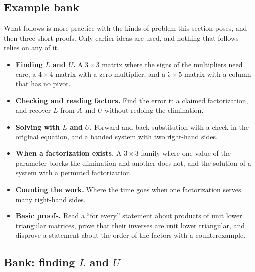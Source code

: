 \documentclass[11pt]{article}
\begin{document}
\subsection*{Example bank}

What follows is more practice with the kinds of problem this section poses, and then three short proofs. Only earlier ideas are used, and nothing that follows relies on any of it.

\begin{remark}
\begin{itemize}
  \item \textbf{Finding $L$ and $U$.} A $3\times3$ matrix where the signs of the multipliers need care, a $4\times4$ matrix with a zero multiplier, and a $3\times5$ matrix with a column that has no pivot.
  \item \textbf{Checking and reading factors.} Find the error in a claimed factorization, and recover $L$ from $A$ and $U$ without redoing the elimination.
  \item \textbf{Solving with $L$ and $U$.} Forward and back substitution with a check in the original equation, and a banded system with two right-hand sides.
  \item \textbf{When a factorization exists.} A $3\times3$ family where one value of the parameter blocks the elimination and another does not, and the solution of a system with a permuted factorization.
  \item \textbf{Counting the work.} Where the time goes when one factorization serves many right-hand sides.
  \item \textbf{Basic proofs.} Read a ``for every'' statement about products of unit lower triangular matrices, prove that their inverses are unit lower triangular, and disprove a statement about the order of the factors with a counterexample.
\end{itemize}
\end{remark}

\subsection*{Bank: finding $L$ and $U$}
\end{document}
